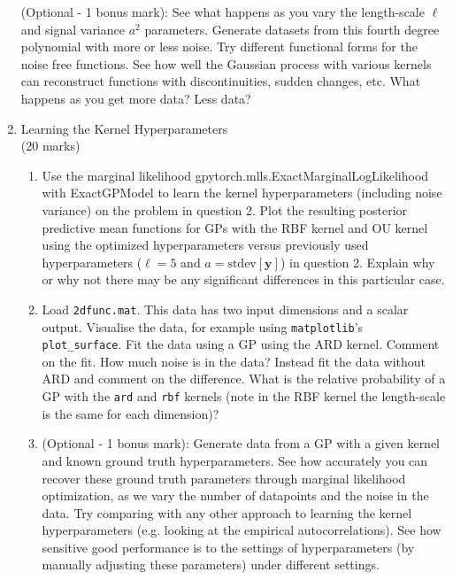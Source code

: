 \documentclass[11pt]{article}
\newcommand{\mbf}[1]{{\boldsymbol{\mathbf{#1}}}}
\renewcommand{\bm}{\mbf}
\begin{document}
\begin{enumerate}
(Optional - 1 bonus mark): See what happens as you vary the length-scale $\ell$ and signal variance $a^2$ parameters.  Generate datasets from this fourth degree polynomial with more or less noise.  Try different functional forms for the noise free functions.  See how well the Gaussian process with various kernels can reconstruct functions with discontinuities, sudden changes, etc.  What happens as you get more data? Less data?


\item Learning the Kernel Hyperparameters \\
(20 marks) \\

\begin{enumerate}[label=(\alph*)]
\item Use the marginal likelihood {gpytorch.mlls.ExactMarginalLogLikelihood} with {ExactGPModel} to learn the kernel hyperparameters (including noise variance) on the problem in question 2.  Plot the resulting posterior predictive mean functions for GPs with the RBF kernel and OU kernel using the optimized hyperparameters versus previously used hyperparameters ($\ell = 5$ and $a = \text{stdev}[\bm{y}]$) in question 2.  Explain why or why not there may be any significant differences in this particular case.
\item Load \texttt{2dfunc.mat}. This data has two input dimensions and a scalar output. Visualise the data, for example
using \texttt{matplotlib}'s \texttt{plot\_surface}.
Fit the data using a GP using the ARD kernel. Comment
on the fit. How much noise is in the data?  Instead fit the data without ARD and comment on the difference.  What is the relative probability of a GP with the \texttt{ard} and \texttt{rbf} kernels (note in the RBF kernel the length-scale is the same for each dimension)?

\item (Optional - 1 bonus mark): Generate data from a GP with a given kernel and known ground truth hyperparameters.  See how accurately you can recover these ground truth parameters through marginal likelihood optimization, as we vary the number of datapoints and the noise in the data.  Try comparing with any other approach to learning the kernel hyperparameters (e.g. looking at the empirical autocorrelations).  See how sensitive good performance is to the settings of hyperparameters (by manually adjusting these parameters) under different settings.

\end{enumerate}


\end{enumerate}
\end{document}
